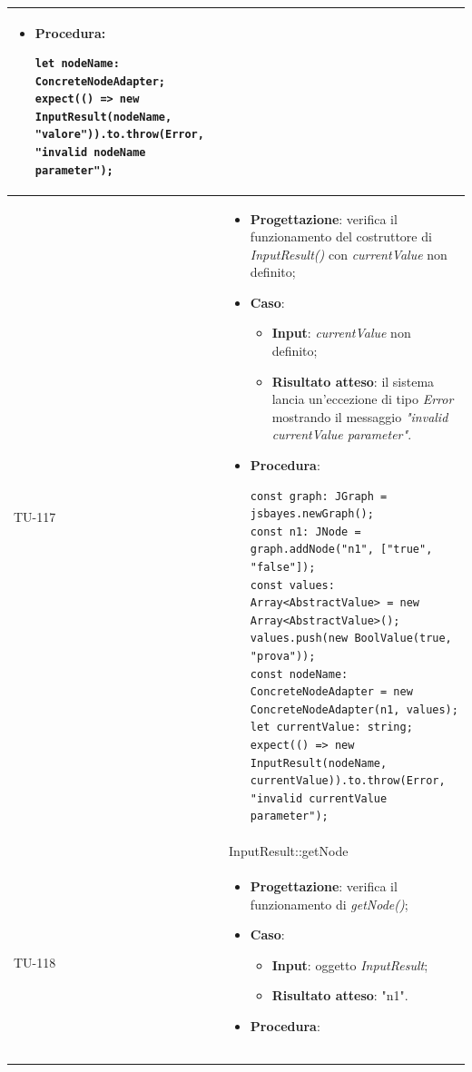 \begin{longtable}{|C{1.5cm}|C{14.5cm}|}
\begin{itemize}
\begin{itemize}
	\end{itemize}
	\item \textbf{Procedura}:
	\begin{lstlisting}
let nodeName: ConcreteNodeAdapter;
expect(() => new InputResult(nodeName, "valore")).to.throw(Error, "invalid nodeName parameter");
	\end{lstlisting}
\end{itemize}\\
\hline
{TU-117} &
\begin{itemize}
	\item \textbf{Progettazione}: verifica il funzionamento del costruttore di \emph{InputResult()} con \emph{currentValue} non definito;
	\item \textbf{Caso}: 
	\begin{itemize}
		\item \textbf{Input}: \emph{currentValue} non definito;
		\item \textbf{Risultato atteso}: il sistema lancia un'eccezione di tipo \emph{Error} mostrando il messaggio \emph{"invalid currentValue parameter"}.
	\end{itemize}
	\item \textbf{Procedura}:
	\begin{lstlisting}
const graph: JGraph = jsbayes.newGraph();
const n1: JNode = graph.addNode("n1", ["true", "false"]);
const values: Array<AbstractValue> = new Array<AbstractValue>();
values.push(new BoolValue(true, "prova"));
const nodeName: ConcreteNodeAdapter = new ConcreteNodeAdapter(n1, values);
let currentValue: string;
expect(() => new InputResult(nodeName, currentValue)).to.throw(Error, "invalid currentValue parameter");
	\end{lstlisting}
\end{itemize}\\
\hline
{} & InputResult::getNode
\\ \hline
{TU-118} &
\begin{itemize}
	\item \textbf{Progettazione}: verifica il funzionamento di \emph{getNode()};
	\item \textbf{Caso}: 
	\begin{itemize}
		\item \textbf{Input}: oggetto \emph{InputResult};
		\item \textbf{Risultato atteso}: "n1".
	\end{itemize}
	\item \textbf{Procedura}:
	\begin{lstlisting}

\end{lstlisting}
\end{itemize}
\end{longtable}
